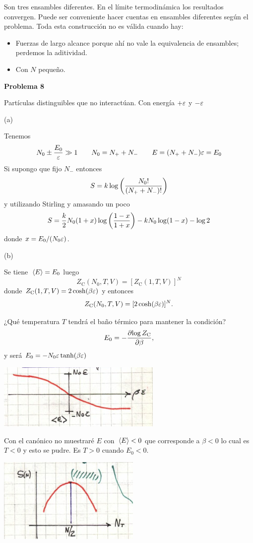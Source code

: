 \documentclass[10pt,oneside]{CBFT_book}
\begin{document}
Son tres ensambles diferentes. En el límite termodinámica los resultados convergen.
Puede ser conveniente hacer cuentas en ensambles diferentes según el problema.
Toda esta construcción no es válida cuando hay:
\begin{itemize}
 \item Fuerzas de largo alcance porque ahí no vale la equivalencia de ensambles; perdemos
 la aditividad.
 \item Con $N$ pequeño.
\end{itemize}


\begin{ejemplo}{\bf Problema 8}

Partículas distinguibles que no interactúan. Con energía $+\varepsilon$ y $-\varepsilon$

(a)

Tenemos
\[
	N_0  \pm \frac{E_0}{\varepsilon} \gg 1 \qquad N_0 = N_+ + N_- \qquad E = ( N_+ + N_- ) \varepsilon = E_0
\]
Si supongo que fijo $N_-$ entonces 
\[
	S = k \log \left( \frac{  N_0!  }{  ( N_+ + N_- )!  } \right)
\]
y utilizando Stirling y amasando un poco
\[
	S = \frac{k}{2} N_0 ( 1 + x ) \log \left( \frac{ 1-x }{ 1+x } \right) - k N_0 \log (1-x) - \log 2
\]
donde $x = E_0/ (N_0 \varepsilon)$.


(b)
 
Se tiene $\:\left\langle E \right\rangle=E_0$  luego
\[
	Z_\text{C}(N_0,T,V) =  [ Z_\text{C}(1,T,V) ]^N
\]
donde $ Z_\text{C}(1,T,V) = 2 \cosh( \beta \varepsilon ) $ y entonces 
\[
	Z_\text{C}(N_0,T,V) =  [ 2 \cosh( \beta \varepsilon ) ]^N.
\]

¿Qué temperatura $T$ tendrá el baño térmico para mantener la condición?
\[
	E_0 = - \frac{\partial^{\hspace{-0.05em}} {\log Z_\text{C}}}{\partial {\beta}^{\hspace{-0.05em}}},
\]
y será $ E_0 = - N_0 \varepsilon \tanh (\beta \varepsilon )$

\includegraphics[scale=0.5]{images/1606329452.jpg} 

Con el canónico no muestraré $E$ con $\:\left\langle E \right\rangle < 0 $ que corresponde a $\beta < 0$ lo cual es $T < 0$
y esto se pudre. Es $T > 0 $ cuando $ E_0 < 0$.

\includegraphics[scale=0.5]{images/1606329459.jpg}


\end{ejemplo}
\end{document}
